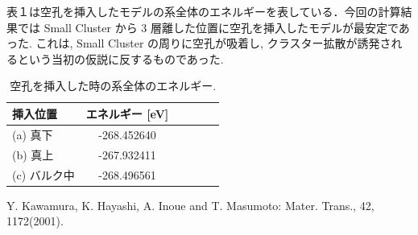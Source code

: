 \documentclass[a4j,twocolumn]{jsarticle}
\begin{document}
表１は空孔を挿入したモデルの系全体のエネルギーを表している．今回の計算結果では Small Cluster から 3 層離した位置に空孔を挿入したモデルが最安定であった. これは, Small Cluster の周りに空孔が吸着し, クラスター拡散が誘発されるという当初の仮説に反するものであった. 

\begin{table}[htb]
\caption{空孔を挿入した時の系全体のエネルギー.}
  \begin{center}
  \small
    \begin{tabular}{|l|c|c|c|c|c|} \hline
 挿入位置 & エネルギー [eV] \\ \hline
   (a) 真下 & -268.452640\\
\hline
   (b) 真上 & -267.932411\\
\hline
   (c) バルク中 & -268.496561\\
\hline
    \end{tabular}
  \end{center}
\end{table}

\begin{thebibliography}{9}
Y. Kawamura, K. Hayashi, A. Inoue and T. Masumoto: Mater. Trans., 42, 1172(2001).

\end{thebibliography}
\end{document}
